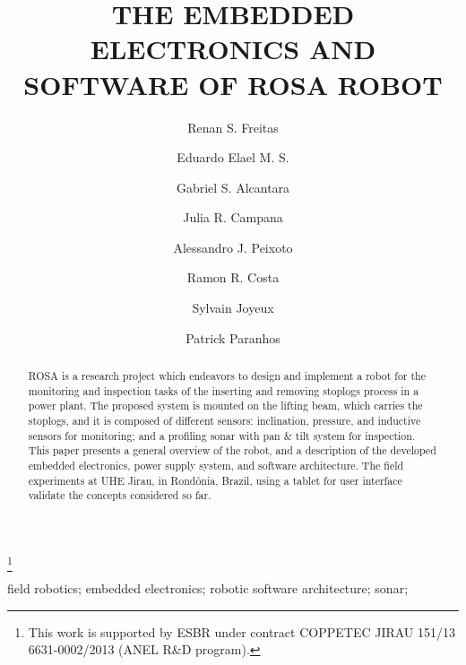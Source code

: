 \documentclass{main}
\begin{document}
\begin{frontmatter}

\title{THE EMBEDDED ELECTRONICS AND SOFTWARE OF ROSA ROBOT
} 

\thanks[footnoteinfo]{This work is supported by ESBR under contract COPPETEC
JIRAU 151/13 6631-0002/2013 (ANEL R\&D program).}

\author[1]{Renan S. Freitas}
\author[1]{Eduardo Elael M. S.}
\author[1]{Gabriel S. Alcantara}
\author[2]{Julia R. Campana}
\author[1]{Alessandro J. Peixoto}
\author[1]{Ramon R. Costa}
\author[3]{Sylvain Joyeux}
\author[3]{Patrick Paranhos}

  \address[1]{Electrical
 Engineering Department, COPPE UFRJ, Rio de Janeiro, Brazil}
  \address[2]{Professional and Technical Communication, Illinois Institute of
  Technology, Illinois, United States} 
  \address[3]{Research Department Robotics Innovation Center, German Research
 Centre for Artificial Intelligence (DFKI), Bremen, Germany}
 
\begin{abstract}                %
ROSA is a research project which endeavors to design and implement a robot for
the monitoring and inspection tasks of the inserting and removing stoplogs
process in a power plant. The proposed system is mounted on the lifting beam,
which carries the stoplogs, and it is composed of different sensors:
inclination, pressure, and inductive sensors for monitoring; and a profiling
sonar with pan \& tilt system for inspection. This paper presents a general
overview of the robot, and a description of the developed embedded electronics, power supply system,
and software architecture. The field experiments at UHE Jirau, in Rond{\^o}nia,
Brazil, using a tablet for user interface validate the concepts considered so far.
\end{abstract}  

\begin{keyword}
field robotics; embedded electronics; robotic software architecture; sonar;
\end{keyword}

\end{frontmatter}








  
 
\appendix
\end{document}
